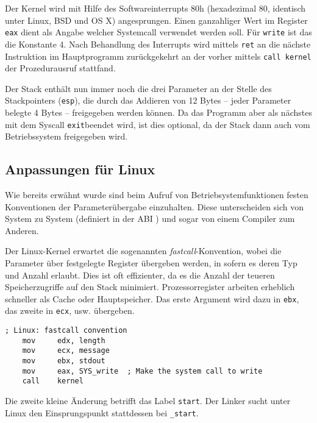Der Kernel wird mit Hilfe des Softwareinterrupts 80h (hexadezimal 80, identisch unter Linux, BSD und OS X) angesprungen. Einen ganzahliger Wert im Register \texttt{eax} dient als Angabe welcher Systemcall verwendet werden soll. Für {\tt write} ist das die Konstante 4. Nach Behandlung des Interrupts wird mittels \texttt{ret} an die nächste Instruktion im Hauptprogramm zurückgekehrt an der vorher mittels \texttt{call kernel} der Prozedurausruf stattfand.

Der Stack enthält nun immer noch die drei Parameter an der Stelle des Stackpointers ({\tt esp}), die durch das Addieren von 12 Bytes – jeder Parameter belegte 4 Bytes – freigegeben werden können. Da das Programm aber als nächstes mit dem Syscall \texttt{exit}beendet wird, ist dies optional, da der Stack dann auch vom Betriebssystem freigegeben wird.


\subsection{Anpassungen für Linux}

Wie bereits erwähnt wurde sind beim Aufruf von Betriebsystemfunktionen festen Konventionen \cite{wp:callconv} der Parameterübergabe einzuhalten. Diese unterscheiden sich von System zu System (definiert in der ABI \cite{wp:abi}) und sogar von einem Compiler zum Anderen.

Der Linux-Kernel erwartet die sogenannten \emph{fastcall}-Konvention, wobei die Parameter über festgelegte Register übergeben werden, in sofern es deren Typ und Anzahl erlaubt. Dies ist oft effizienter, da es die Anzahl der teueren Speicherzugriffe auf den Stack minimiert. Prozessorregister arbeiten erheblich schneller als Cache oder Hauptspeicher. Das erste Argument wird dazu in {\tt ebx}, das zweite in {\tt ecx}, usw. übergeben.

\begin{lstlisting}[caption=Linux-Kernel Aufrufkonvention]
    ; Linux: fastcall convention
    mov     edx, length
    mov     ecx, message
    mov     ebx, stdout
    mov     eax, SYS_write  ; Make the system call to write
    call    kernel
\end{lstlisting}

Die zweite kleine Änderung betrifft das Label {\tt start}. Der Linker sucht unter Linux den Einsprungspunkt stattdessen bei {\tt \_start}.
